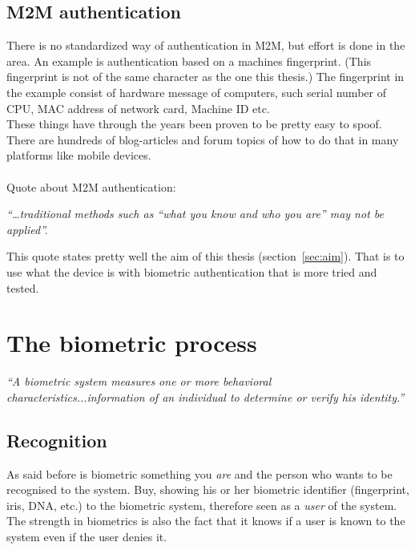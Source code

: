 \subsection{M2M authentication}
There is no standardized way of authentication in M2M, but effort is done in the area. An example is authentication based on a machines fingerprint. (This fingerprint is not of the same character as the one this thesis.)  The fingerprint in the example  consist of hardware message of computers, such serial number of CPU, MAC address of network card, Machine ID etc. \cite[]{auth:M2M} \\
These things have through the years been proven to be pretty easy to spoof. There are hundreds of blog-articles and forum topics of how to do that in many platforms like mobile devices. \\
\\
Quote about M2M authentication:
\begin{center} 
\textit{``\dots traditional methods such as “what you know and who you are” may not be applied''.}
\end{center}
  \begin{flushright}\cite[]{auth:M2Mcom}\end{flushright}

This quote states pretty well the aim of this thesis (section~\ref{sec:aim}). That is to use what the device is with biometric authentication that is more  tried and tested.


\section{The biometric process}\label{sec:biometric}
\begin{center}\textit{``A biometric system measures one or more behavioral characteristics...information of an individual to determine or verify his identity.''} \end{center}\begin{flushright}\cite[p.~3]{introbio}\end{flushright}

\subsection{Recognition}
As said before is biometric something you \textit{are} and the person who wants to be recognised to the system. Buy, showing his or her biometric identifier (fingerprint, iris, DNA, etc.) to the biometric system, therefore seen as a \textit{user} of the system. The strength in biometrics is also the fact that it knows if a user is known to the system even if the user denies it. \cite[ch.~1]{introbio}

